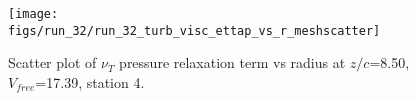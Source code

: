 \begin{figure}[H]
\centering
\texttt{[image: figs/run\_32/run\_32\_turb\_visc\_ettap\_vs\_r\_meshscatter]}
\caption{Scatter plot of $\nu_T$ pressure relaxation term vs radius at $z/c$=8.50, $V_{free}$=17.39, station 4.}
\label{fig:run_32_turb_visc_ettap_vs_r_meshscatter}
\end{figure}


